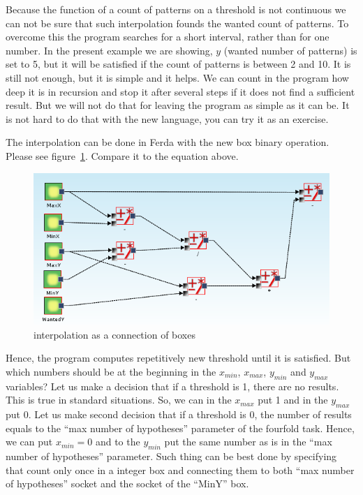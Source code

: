 \documentclass[a4paper,12pt]{book}
\begin{document}
Because the function of a count of patterns on a threshold is not continuous we can not be sure that such interpolation founds the wanted count of patterns. To overcome this the program searches for a short interval, rather than for one number. In the present example we are showing, $y$ (wanted number of patterns) is set to 5, but it will be satisfied if the count of patterns is between 2 and 10. It is still not enough, but it is simple and it helps. We can count in the program how deep it is in recursion and stop it after several steps if it does not find a sufficient result. But we will not do that for leaving the program as simple as it can be. It is not hard to do that with the new language, you can try it as an exercise. 

The interpolation can be done in Ferda with the new box binary operation. Please see figure~\ref{fig:linearInterpolationBoxes}. Compare it to the equation above.

\begin{figure}
	\includegraphics[width=1\textwidth]{linearInterpolation}
	\caption{interpolation as a connection of boxes}
	\label{fig:linearInterpolationBoxes}
\end{figure}

Hence, the program computes repetitively new threshold until it is satisfied. But which numbers should be at the beginning in the $x_{min}$, $x_{max}$, $y_{min}$ and $y_{max}$ variables? Let us make a decision that if a threshold is 1, there are no results. This is true in standard situations. So, we can in the $x_{max}$ put 1 and in the $y_{max}$ put 0. Let us make second decision that if a threshold is 0, the number of results equals to the ``max number of hypotheses'' parameter of the fourfold task. Hence, we can put $x_{min}=0$ and to the $y_{min}$ put the same number as is in the ``max number of hypotheses'' parameter. Such thing can be best done by specifying that count only once in a integer box and connecting them to both ``max number of hypotheses'' socket and the socket of the ``MinY'' box.
\end{document}
